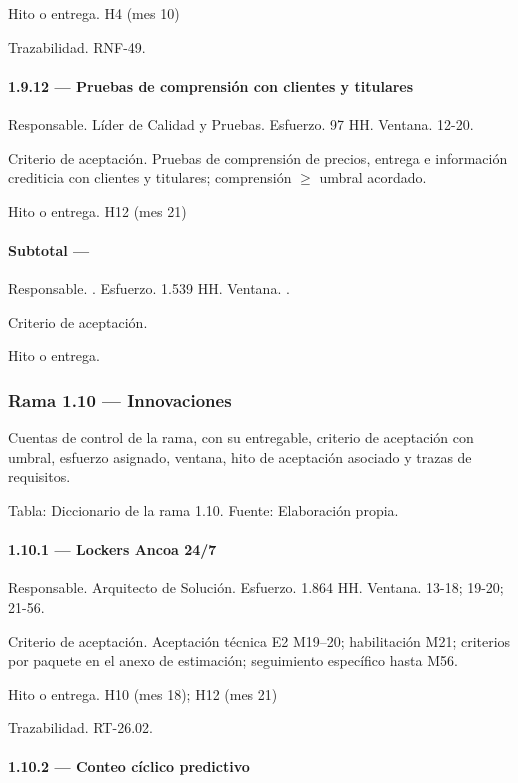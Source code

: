 \documentclass[11pt]{article}
\begin{document}
Hito o entrega. H4 (mes 10)

Trazabilidad. RNF-49.

\paragraph{1.9.12 — Pruebas de comprensión con clientes y titulares}

Responsable. Líder de Calidad y Pruebas. Esfuerzo. 97 HH. Ventana. 12-20.

Criterio de aceptación. Pruebas de comprensión de precios, entrega e información crediticia con clientes y titulares; comprensión \(\geq\) umbral acordado.

Hito o entrega. H12 (mes 21)

\paragraph{Subtotal — }

Responsable. . Esfuerzo. 1.539 HH. Ventana. .

Criterio de aceptación.

Hito o entrega.

\subsubsection{Rama 1.10 — Innovaciones}

Cuentas de control de la rama, con su entregable, criterio de aceptación con umbral, esfuerzo asignado, ventana, hito de aceptación asociado y trazas de requisitos.

Tabla: Diccionario de la rama 1.10. Fuente: Elaboración propia.

\paragraph{1.10.1 — Lockers Ancoa 24/7}

Responsable. Arquitecto de Solución. Esfuerzo. 1.864 HH. Ventana. 13-18; 19-20; 21-56.

Criterio de aceptación. Aceptación técnica E2 M19–20; habilitación M21; criterios por paquete en el anexo de estimación; seguimiento específico hasta M56.

Hito o entrega. H10 (mes 18); H12 (mes 21)

Trazabilidad. RT-26.02.

\paragraph{1.10.2 — Conteo cíclico predictivo}
\end{document}
